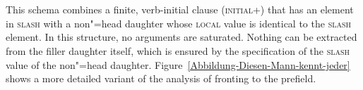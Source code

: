 \begin{schema}[Head"=Filler Schema]
\label{hf-schemaa}
~\\\samepage
{} \impl\\
\end{schema}
This schema combines a finite, verb-initial clause (\textsc{initial}+) that has an element in \textsc{slash} with a non"=head daughter whose
\textsc{local} value is identical to the \textsc{slash} element.
In this structure, no arguments are saturated. Nothing can be extracted from the filler daughter itself, which is ensured
by the specification of the \textsc{slash} value of the non"=head daughter. Figure~\vref{Abbildung-Diesen-Mann-kennt-jeder} shows a more detailed
variant of the analysis of fronting to the prefield.


